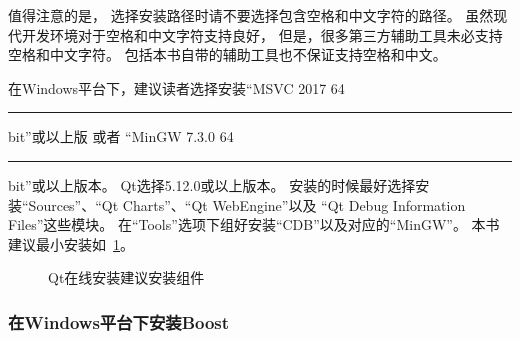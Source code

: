 值得注意的是，
选择安装路径时请不要选择包含空格和中文字符的路径。
虽然现代开发环境对于空格和中文字符支持良好，
但是，很多第三方辅助工具未必支持空格和中文字符。
包括本书自带的辅助工具也不保证支持空格和中文。

在Windows平台下，建议读者选择安装“MSVC 2017 64\hspace{0.05em}\rule[0.7ex]{0.4em}{0.65pt}\hspace{0.05em}bit”或以上版
或者
“MinGW 7.3.0 64\hspace{0.05em}\rule[0.7ex]{0.4em}{0.65pt}\hspace{0.05em}bit”或以上版本。
Qt选择5.12.0或以上版本。
安装的时候最好选择安装“Sources”、“Qt Charts”、“Qt WebEngine”以及
“Qt Debug Information Files”这些模块。
在“Tools”选项下组好安装“CDB”以及对应的“MinGW”。
本书建议最小安装如\figurename\ \ref{p000001}。
\begin{figure}[htb] %
\marginnote{\setlength\fboxsep{2pt}\fbox{\footnotesize{\kaishu\figurename\,}\footnotesize{\ref{p000001}}}}\centering %
\setlength\fboxsep{0pt} %
\caption{Qt在线安装建议安装组件} %
\label{p000001} %
\end{figure}


\FloatBarrier
\subsubsection{
在Windows平台下安装Boost
}\label{ss000210}

